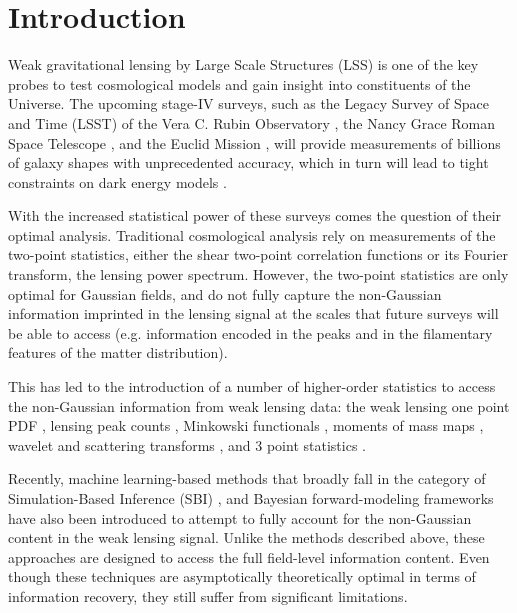\documentclass{aa}
\begin{document}
\section{Introduction}
Weak gravitational lensing by Large Scale Structures (LSS) is one of the key probes to test cosmological models and gain insight into constituents of the Universe. The upcoming stage-IV surveys, such as the Legacy Survey of Space and Time (LSST) of the Vera C. Rubin Observatory \cite{ivezic2019lsst}, the Nancy Grace Roman Space Telescope \citep{spergel2015wide}, and  the Euclid Mission \citep{laureijs2011euclid}, will provide measurements of billions of galaxy shapes with unprecedented accuracy, which in turn will lead to tight constraints on dark energy models \citep[e.g.][]{mandelbaum2018lsst}.

With the increased statistical power of these surveys comes the question of their optimal analysis. Traditional cosmological analysis rely on measurements of the two-point statistics, either the shear two-point correlation functions or its Fourier transform, the lensing power spectrum. However, the two-point statistics are only optimal for Gaussian fields, and do not fully capture the non-Gaussian information imprinted in the lensing signal at the scales that future surveys will be able to access (e.g. information encoded in the peaks and in the filamentary features of the matter distribution).

 This has led to the introduction of a number of  higher-order statistics to access the non-Gaussian information from weak lensing data: 
the weak lensing one point PDF \citep{liu2019constraining, uhlemann2020fisher, boyle2021nuw}, lensing peak counts \citep{liu2015cosmology, liu2015cosmological, lin2015new, kacprzak2016cosmology, peel2017cosmological, shan2018kids, martinet2018kids, ajani2020constraining, harnois2021cosmic, zurcher2022dark}, Minkowski functionals \citep{kratochvil2012probing, petri2013cosmology}, moments of mass maps \citep{gatti2021dark}, wavelet and scattering transforms \citep{ajani2021starlet, cheng2021weak}, and 3 point statistics \citep{takada2004cosmological, semboloni2011weak, rizzato2019tomographic, halder2021integrated}. 


Recently, machine learning-based methods that broadly fall in the category of Simulation-Based Inference (SBI) \citep{fluri2019cosmological, kacprzak2022deeplss, fluri2021cosmological, jeffrey2021likelihood, fluri2022full}, and Bayesian forward-modeling frameworks \citep{porqueres2021bayesian, sarma2022map} have also been introduced to attempt to fully account for the non-Gaussian content in the weak lensing signal. Unlike the methods described above, these approaches are designed to access the full field-level information content. Even though these techniques are asymptotically theoretically optimal in terms of information recovery, they still suffer from significant limitations.
\end{document}
